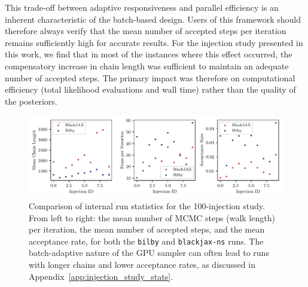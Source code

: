 \documentclass[fleqn,usenatbib]{mnras}
\begin{document}
This trade-off between adaptive responsiveness and parallel efficiency
is an inherent characteristic of the batch-based design. Users of this 
framework should therefore always verify that the mean number of
accepted steps per iteration remains sufficiently high for
accurate results. For the injection study presented in this work, we
find that in most of the instances where this effect occurred, the compensatory
increase in chain length was sufficient to maintain an adequate number
of accepted steps. The primary impact was therefore on computational
efficiency (total likelihood evaluations and wall time) rather than the
quality of the posteriors.

\begin{figure}
    \centering
    \includegraphics{figures/performance_metrics.pdf}
    \caption{Comparison of internal run statistics for the 100-injection
    study. From left to right: the mean number of MCMC steps (walk length)
    per iteration, the mean number of accepted steps, and the
    mean acceptance rate, for both the \texttt{bilby} and 
    \texttt{blackjax-ns} runs. The batch-adaptive nature of the GPU sampler can often
    lead to runs with longer chains and lower acceptance rates,
    as discussed in Appendix~\ref{app:injection_study_stats}.}
    \label{fig:injection_study_stats}
\end{figure}
\end{document}
